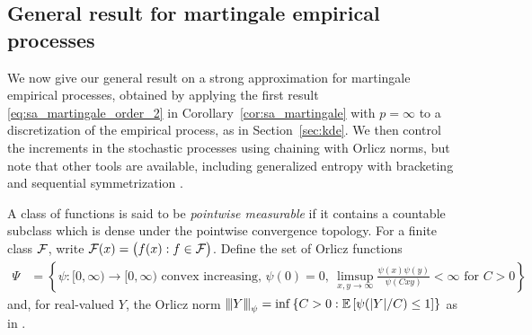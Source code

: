 \subsection{General result for martingale empirical processes}

We now give our general result on a strong approximation for
martingale empirical processes, obtained by applying
the first result \eqref{eq:sa_martingale_order_2} in
Corollary~\ref{cor:sa_martingale} with $p=\infty$
to a discretization of the empirical process,
as in Section~\ref{sec:kde}.
We then control the increments in the stochastic processes
using chaining with Orlicz norms,
but note that other tools are available,
including generalized entropy with bracketing \citep{geer2000empirical}
and sequential symmetrization \citep{rakhlin2015sequential}.

A class of functions is said to be \emph{pointwise measurable}
if it contains a countable subclass which is dense under
the pointwise convergence topology.
For a finite class $\mathcal{F}$, write
$\mathcal{F}(x) = \big(f(x) : f \in \mathcal{F}\big)$.
Define the set of Orlicz functions
%
\begin{align*}
  \Psi
  &=
  \left\{
  \psi: [0, \infty) \to [0, \infty)
  \text{ convex increasing, }
  \psi(0) = 0,\
  \limsup_{x,y \to \infty} \tfrac{\psi(x) \psi(y)}{\psi(C x y)} < \infty
  \text{ for } C > 0
  \right\}
\end{align*}
%
and, for real-valued $Y$, the Orlicz norm
${\vert\kern-0.25ex\vert\kern-0.25ex\vert} Y {\vert\kern-0.25ex\vert\kern-0.25ex\vert}_\psi
= \inf
\left\{ C > 0:
\mathbb{E} \left[ \psi(|Y|/C) \leq 1 \right]
\right\}$
as in \citet[Section~2.2]{van1996weak}.

